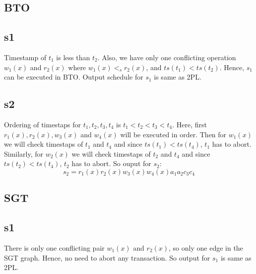 \documentclass[12pt]{article}
\begin{document}
\subsection*{BTO}
\subsection*{s1}
Timestamp of $t_1$ is less than $t_2$. Also, we have only one conflicting operation $w_1(x)$ and $r_2(x)$ where $w_1(x) <_s r_2(x)$, and $ts(t_1) < ts(t_2)$. Hence, $s_1$ can be executed in BTO. Output schedule for $s_1$ is same as 2PL.
\subsection*{s2}
Ordering of timestaps for $t_1, t_2, t_3, t_4$ is $t_1 < t_2 < t_3 < t_4$. Here, first $r_1(x), r_2(x), w_3(x) $ and $w_4(x)$ will be executed in order. Then for $w_1(x)$ we will check timestaps of $t_1$ and $t_4$ and since $ts(t_1) < ts(t_4)$, $t_1$ has to abort. Similarly, for $w_2(x)$ we will check timestaps of $t_2$ and $t_4$ and since $ts(t_2) < ts(t_4)$, $t_2$ has to abort. 
So ouput for $s_2$:
\begin{equation*}
    s_2 = r_1(x) r_2(x) w_3(x) w_4(x) a_1 a_2 c_3 c_4
\end{equation*}

\subsection*{SGT}
\subsection*{s1}
There is only one conflicting pair $w_1(x)$ and $r_2(x)$, so only one edge in the SGT graph. Hence, no need to abort any transaction. So output for $s_1$ is same as 2PL. 
\end{document}
